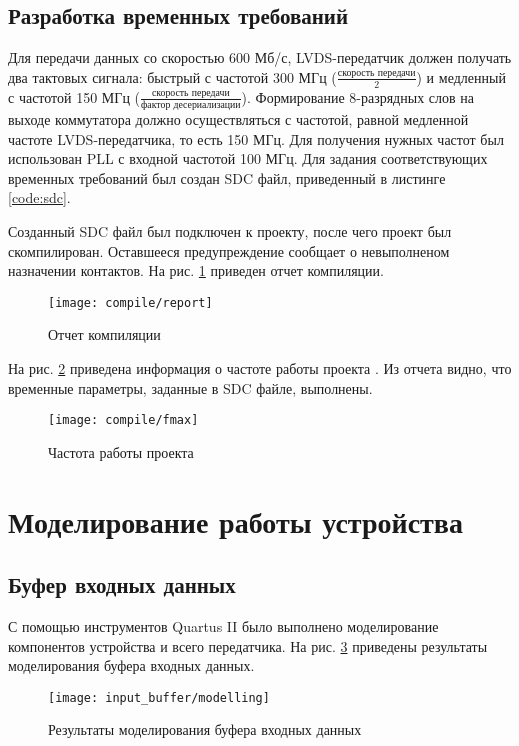 \subsection{Разработка временных требований}

Для передачи данных со скоростью 600 Мб/с, LVDS-передатчик должен получать два тактовых сигнала: быстрый с частотой 300 МГц ($\frac{\text{скорость передачи}}{2}$) и медленный с частотой 150 МГц ($\frac{\text{скорость передачи}}{\text{фактор десериализации}}$). Формирование 8-разрядных слов на выходе коммутатора должно осуществляться с частотой, равной медленной частоте LVDS-передатчика, то есть 150 МГц. Для получения нужных частот был использован PLL с входной частотой 100 МГц. Для задания соответствующих временных требований был создан SDC файл, приведенный в листинге \ref{code:sdc}.



Созданный SDC файл был подключен к проекту, после чего проект был скомпилирован. Оставшееся предупреждение сообщает о невыполненом назначении контактов. На рис. \ref{fig:compile-report} приведен отчет компиляции.
\begin{figure}[H]
	\centering
	\texttt{[image: compile/report]}
	\caption{Отчет компиляции}
	\label{fig:compile-report}
\end{figure}

На рис. \ref{fig:compile-fmax} приведена информация о частоте работы проекта . Из отчета видно, что временные параметры, заданные в SDC файле, выполнены.
\begin{figure}[H]
	\centering
	\texttt{[image: compile/fmax]}
	\caption{Частота работы проекта}
	\label{fig:compile-fmax}
\end{figure}

\section{Моделирование работы устройства}

\subsection{Буфер входных данных}

С помощью инструментов Quartus II было выполнено моделирование компонентов устройства и всего передатчика. На рис. \ref{fig:input_buffer_modelling} приведены результаты моделирования буфера входных данных. 
\begin{figure}[H]
	\centering
	\texttt{[image: input\_buffer/modelling]}
	\caption{Результаты моделирования буфера входных данных}
	\label{fig:input_buffer_modelling}
\end{figure}

